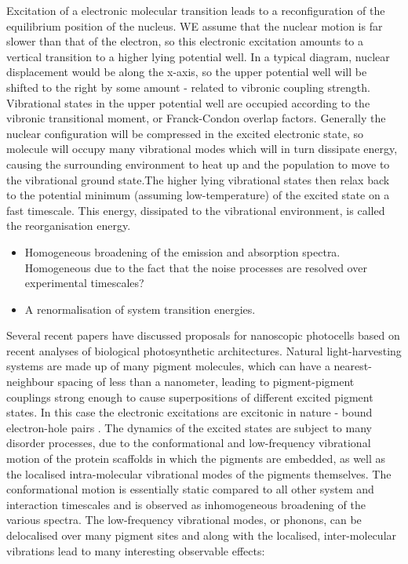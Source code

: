 \documentclass[]{article}
\begin{document}
Excitation of a electronic molecular transition leads to a reconfiguration of the equilibrium position of the nucleus. WE assume that the nuclear motion is far slower than that of the electron, so this electronic excitation amounts to a vertical transition to a higher lying potential well. In a typical diagram, nuclear displacement would be along the x-axis, so the upper potential well will be shifted to the right by some amount - related to vibronic coupling strength. Vibrational states in the upper potential well are occupied according to the vibronic transitional moment, or Franck-Condon overlap factors. Generally the nuclear configuration will be compressed in the excited electronic state, so molecule will occupy many vibrational modes which will in turn dissipate energy, causing the surrounding environment to heat up and the population to move to the vibrational ground state.The higher lying vibrational states then relax back to the potential minimum (assuming low-temperature) of the excited state on a fast timescale. This energy, dissipated to the vibrational environment, is called the reorganisation energy.
\begin{itemize}
	\item Homogeneous broadening of the emission and absorption spectra. Homogeneous due to the fact that the noise processes are resolved over experimental timescales?
	\item A renormalisation of system transition energies.
\end{itemize}
Several recent papers have discussed proposals for nanoscopic photocells based on recent analyses of biological photosynthetic architectures\cite{Dorfman}\cite{Creatore2013}\cite{Killoran2015}\cite{Fruchtman2016}. Natural light-harvesting systems are made up of many pigment molecules, which can have a nearest-neighbour spacing of less than a nanometer\cite{Adolphs2006}, leading to pigment-pigment couplings strong enough to cause superpositions of different excited pigment states. In this case the electronic excitations are excitonic in nature - bound electron-hole pairs . The dynamics of the excited states are subject to many disorder processes, due to the conformational and low-frequency vibrational motion of the protein scaffolds in which the pigments are embedded, as well as the localised intra-molecular vibrational modes of the pigments themselves. The conformational motion is essentially static compared to all other system and interaction timescales and is observed as inhomogeneous broadening of the various spectra. The low-frequency vibrational modes, or phonons, can be delocalised over many pigment sites and along with the localised, inter-molecular vibrations lead to many interesting observable effects:
\end{document}
